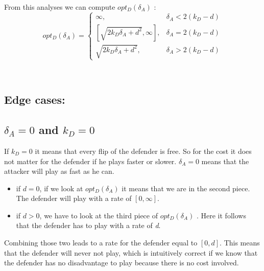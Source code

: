 

~~\\
From this analyses we can compute $opt_{D}(\delta_{A})$ : \\

 \begin{displaymath}
  opt_{D}(\delta_{A}) = \left\{
     \begin{array}{lr}
          \infty , & \delta_{A} < 2(k_{D} - d)\\
      \left[ \sqrt{2k_{D}\delta_{A} + d^{2}},\infty\right] , & \delta_{A} = 2(k_{D} - d) \\
      \sqrt{2k_{D}\delta_{A} + d^{2}}, & \delta_{A} > 2(k_{D} - d)
     \end{array}
   \right.
\end{displaymath}

~~\\


\subsection*{Edge cases:}

\subsection*{$\delta_{A}=0$ and $k_{D}=0$}

If $k_{D}=0$ it means that every flip of the defender is free. So for the cost it does not matter for the defender if he plays faster or slower. $\delta_{A}=0$ means that the attacker will play as fast as he can.  
\begin{itemize}
\item if $d=0$, if we look at $opt_{D}(\delta_{A})$ it means that we are in the second piece. The defender will play with a rate of $[0,\infty]$. 
\item if $d >0$, we have to look at the third piece of  $opt_{D}(\delta_{A})$ . Here it follows that the defender has to play with a rate of \textit{d}.
\end{itemize}

Combining those two leads to a rate for the defender equal to $[0,d]$. This means that the defender will never not play, which is intuitively correct if we know that the defender has no disadvantage to play because there is no cost involved.\\


